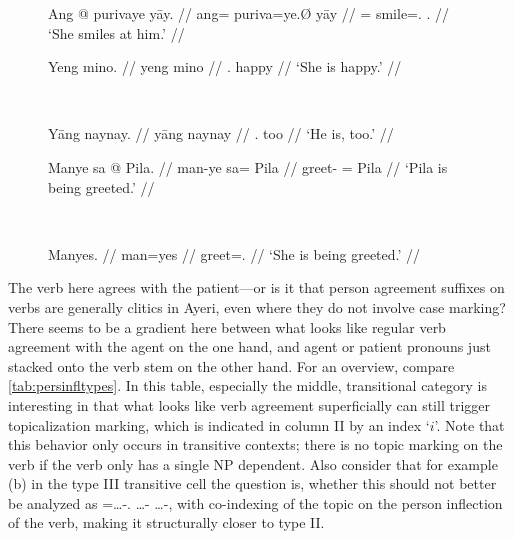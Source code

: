 \begin{figure}[h]
\ex\label{ex:ayrpronagr} %
\begingl
	\gla Ang @ purivaye yāy. //
	\glb ang= puriva=ye.Ø yāy //
	\glc \AgtT{}= smile=\TsgF{}.\Top{} \TsgM{}.\Loc{} //
	\glft `She smiles at him.' //
\endgl\xe
\end{figure}

\begin{figure}[h]
\ex{}\label{ex:indeppro} %
\begin{minipage}[t]{.5\remaining}
\tl\quad\begingl
	\gla Yeng mino. //
	\glb yeng mino //
	\glc \TsgF{}.\Aarg{} happy //
	\glft `She is happy.' //
\endgl
\end{minipage}
~
\begin{minipage}[t]{.5\remaining}
\tl\quad\begingl
	\gla Yāng naynay. //
	\glb yāng naynay //
	\glc \TsgM{}.\Aarg{} too //
	\glft `He is, too.' //
\endgl
\end{minipage}
\xe
\end{figure}

\begin{figure}[h]
\ex{}\label{ex:passive} %
\begin{minipage}[t]{.5\remaining}
\tl\quad\label{ex:manye}\begingl
	\gla Manye sa @ Pila. //
	\glb man-ye sa= ​Pila //
	\glc greet-\TsgF{} \Parg{}= ​Pila //
	\glft `Pila is being greeted.' //
\endgl
\end{minipage}
~
\begin{minipage}[t]{.5\remaining}
\tl\quad\label{ex:manyes}\begingl
	\gla Manyes. //
	\glb man=yes //
	\glc greet=\TsgF{}.\Parg{} //
	\glft `She is being greeted.' //
\endgl
\end{minipage}
\xe
\end{figure}

The verb here agrees with the patient---or is it that person agreement suffixes
on verbs are generally clitics in Ayeri, even where they do not involve case
marking? There seems to be a gradient here between what looks like regular verb
agreement with the agent on the one hand, and agent or patient pronouns just
stacked onto the verb stem on the other hand. For an overview, compare
\autoref{tab:persinfltypes}. In this table, especially the middle,
transitional category is interesting in that what looks like verb agreement
superficially can still trigger topicalization marking, which is indicated in
column II by an index `$i$'. Note that this behavior only occurs in transitive
contexts; there is no topic marking on the verb if the verb only has a single
NP dependent. Also consider that for example (b) in the type III transitive
cell the question is, whether this should not better be analyzed as
\AgtT{}=…-\TsgM{}.\Top{} …-\Top{} …-\Parg{}, with co-indexing of the topic on 
the person inflection of the verb, making it structurally closer to type II.

